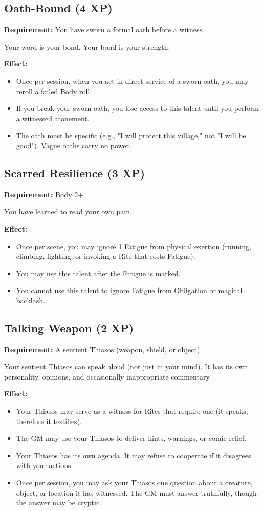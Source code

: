 \subsection{Oath-Bound (4 XP)}

\textbf{Requirement:} You have sworn a formal oath before a witness.

Your word is your bond. Your bond is your strength.

\textbf{Effect:}
\begin{itemize}
\item Once per session, when you act in direct service of a sworn oath, you may reroll a failed Body roll.
\item If you break your sworn oath, you lose access to this talent until you perform a witnessed atonement.
\item The oath must be specific (e.g., "I will protect this village," not "I will be good"). Vague oaths carry no power.
\end{itemize}

\subsection{Scarred Resilience (3 XP)}

\textbf{Requirement:} Body 2+

You have learned to read your own pain.

\textbf{Effect:}
\begin{itemize}
\item Once per scene, you may ignore 1 Fatigue from physical exertion (running, climbing, fighting, or invoking a Rite that costs Fatigue).
\item You may use this talent after the Fatigue is marked.
\item You cannot use this talent to ignore Fatigue from Obligation or magical backlash.
\end{itemize}

\subsection{Talking Weapon (2 XP)}

\textbf{Requirement:} A sentient Thiasos (weapon, shield, or object)

Your sentient Thiasos can speak aloud (not just in your mind). It has its own personality, opinions, and occasionally inappropriate commentary.

\textbf{Effect:}
\begin{itemize}
\item Your Thiasos may serve as a witness for Rites that require one (it speaks, therefore it testifies).
\item The GM may use your Thiasos to deliver hints, warnings, or comic relief.
\item Your Thiasos has its own agenda. It may refuse to cooperate if it disagrees with your actions.
\item Once per session, you may ask your Thiasos one question about a creature, object, or location it has witnessed. The GM must answer truthfully, though the answer may be cryptic.
\end{itemize}

